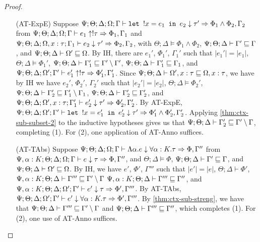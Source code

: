 \begin{proof}
\begin{itemize}
  \item[(AT-ExpE)] Suppose $\Psi ; \Theta ; \Delta ; \Omega ; \Gamma \vdash \texttt{let } !x = e_1 \texttt{ in } e_2 \downarrow \tau' \Rightarrow \Phi_1 \wedge \Phi_2, \Gamma_2$
  from $\Psi ; \Theta ; \Delta ; \Omega ; \Gamma \vdash e_1 \uparrow !\tau \Rightarrow \Phi_1,\Gamma_1$
  and $\Psi ; \Theta ; \Delta ; \Omega, x : \tau ; \Gamma_1 \vdash e_2 \downarrow \tau' \Rightarrow \Phi_2,\Gamma_2$, with
  $\Theta ; \Delta \vDash \Phi_1 \wedge \Phi_2$,
  $\Psi ; \Theta ; \Delta \vdash \Gamma' \sqsubseteq \Gamma$, and
  $\Psi ; \Theta ; \Delta \vdash \Omega' \sqsubseteq \Omega$.
  By IH, there are $e_1'$, $\Phi_1'$, $\Gamma_1'$ such that
  $|e_1'| = |e_1|$,
  $\Theta ; \Delta \vDash \Phi_1'$,
  $\Psi ; \Theta ; \Delta \vdash \Gamma_1' \sqsubseteq \Gamma' \setminus \Gamma'$,
  $\Psi ; \Theta ; \Delta \vdash \Gamma_1' \sqsubseteq \Gamma_1$, and  
  $\Psi ; \Theta ; \Delta ; \Omega' ; \Gamma' \vdash e_1' \uparrow !\tau \Rightarrow \Phi_1',\Gamma_1'$.
  Since $\Psi ; \Theta ; \Delta \vdash \Omega', x : \tau \sqsubseteq \Omega, x : \tau$, we have
  by IH we have $e_2'$, $\Phi_2'$, $\Gamma_2'$ such that
  $|e_2'| = |e_2|$,
  $\Theta ; \Delta \vDash \Phi_2'$,
  $\Psi ; \Theta ; \Delta \vdash \Gamma_2' \sqsubseteq \Gamma_1' \setminus \Gamma_1$,
  $\Psi ; \Theta ; \Delta \vdash \Gamma_2' \sqsubseteq \Gamma_2'$, and
  $\Psi ; \Theta ; \Delta ; \Omega', x : \tau ; \Gamma_1' \vdash e_2' \downarrow \tau' \Rightarrow \Phi_2',\Gamma_2'$.
  By AT-ExpE,
  $\Psi ; \Theta ; \Delta ; \Omega' ; \Gamma' \vdash \texttt{let } !x = e_1' \texttt{ in } e_2' \downarrow \tau' \Rightarrow \Phi_1' \wedge \Phi_2', \Gamma_2'$.
  Applying \autoref{thm:ctx-sub-subset-2} to the inductive hypotheses gives us that
  $\Psi ; \Theta ; \Delta \vdash \Gamma_2' \sqsubseteq \Gamma' \setminus \Gamma$, completing (1).
  For (2), one application of AT-Anno suffices.
  
  \item[(AT-TAbs)] Suppose $\Psi ; \Theta ; \Delta ; \Omega ; \Gamma \vdash \Lambda \alpha. e \downarrow \forall \alpha : K.\tau \Rightarrow \Phi,\Gamma''$ from
  $\Psi, \alpha : K ; \Theta ; \Delta ; \Omega ; \Gamma \vdash e \downarrow \tau \Rightarrow \Phi, \Gamma''$, and
  $\Theta ; \Delta \vDash \Phi$,
  $\Psi ; \Theta ; \Delta \vdash \Gamma' \sqsubseteq \Gamma$, and
  $\Psi ; \Theta ; \Delta \vdash \Omega' \sqsubseteq \Omega$.
  By IH, we have $e'$, $\Phi'$, $\Gamma'''$ such that
  $|e'| = |e|$,
  $\Theta ; \Delta \vdash \Phi'$,
  $\Psi, \alpha : K ; \Theta ; \Delta \vdash \Gamma''' \sqsubseteq \Gamma' \setminus \Gamma$
  $\Psi, \alpha : K ; \Theta ; \Delta \vdash \Gamma''' \sqsubseteq \Gamma''$, and
  $\Psi, \alpha : K ; \Theta ; \Delta ; \Omega' ; \Gamma' \vdash e' \downarrow \tau \Rightarrow \Phi',\Gamma'''$.
  By AT-TAbs, $\Psi ; \Theta ; \Delta ; \Omega' ; \Gamma' \vdash e' \downarrow \forall \alpha : K. \tau \Rightarrow \Phi',\Gamma'''$.
  By \autoref{thm:ctx-sub-streng}, we have that $\Psi ; \Theta ; \Delta \vdash \Gamma''' \sqsubseteq \Gamma' \setminus \Gamma$
  and $\Psi  ; \Theta ; \Delta \vdash \Gamma''' \sqsubseteq \Gamma''$, which completes (1).
  For (2), one use of AT-Anno suffices.
  

\end{itemize}
\end{proof}
